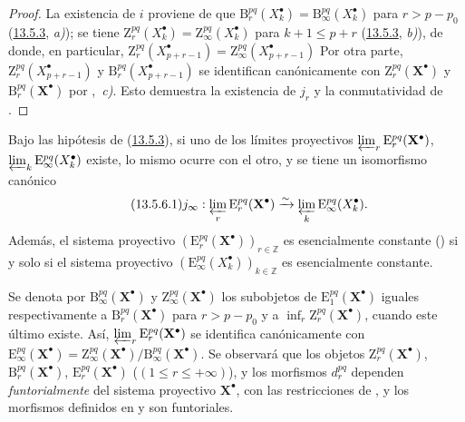 \begin{proof}
La existencia de $i$ proviene de que $\mathrm B_r^{pq}(X_k^\bullet)=\mathrm B_\infty^{pq}(X_k^\bullet)$ para $r>p-p_0$ (\hyperref[0.13.5.3-fr]{13.5.3}, \emph{a)}); se tiene
$\mathrm Z_r^{pq}(X_k^\bullet)=\mathrm Z_\infty^{pq}(X_k^\bullet)$ para $k+1\leq p+r$ (\hyperref[0.13.5.3-fr]{13.5.3}, \emph{b)}), de donde, en particular,
$\mathrm Z_r^{pq}(X_{p+r-1}^\bullet)=
\mathrm Z_\infty^{pq}(X_{p+r-1}^\bullet)$
Por otra parte,
$\mathrm Z_r^{pq}(X_{p+r-1}^\bullet)$ y
$\mathrm B_r^{pq}(X_{p+r-1}^\bullet)$ se identifican canónicamente con
$\mathrm Z_r^{pq}(\mathbf X^\bullet)$ y
$\mathrm B_r^{pq}(\mathbf X^\bullet)$ por
,~\emph{c)}.
Esto demuestra la existencia de $j_r$ y la conmutatividad de
.
\end{proof}

\begin{corollary}[13.5.6]
\label{0.13.5.6-fr}
Bajo las hipótesis de \textup{(\hyperref[0.13.5.3-fr]{13.5.3})}, si uno de los límites proyectivos $\varprojlim_r\mathrm E_r^{pq}(\mathbf X^\bullet)$, $\varprojlim_k\mathrm E_\infty^{pq}(X_k^\bullet)$ existe, lo mismo ocurre con el otro, y se tiene un isomorfismo canónico
\begin{equation}
\label{0.13.5.6.1-fr}
\tag{13.5.6.1}
j_\infty:\varprojlim_r\mathrm E_r^{pq}(\mathbf X^\bullet)
\xrightarrow{\sim}
\varprojlim_k\mathrm E_\infty^{pq}(X_k^\bullet).
\end{equation}
Además, el sistema proyectivo
$(\mathrm E_r^{pq}(\mathbf X^\bullet))_{r\in\mathbb Z}$ es esencialmente
constante \textup{()} si y solo si el sistema proyectivo
$(\mathrm E_\infty^{pq}(X_k^\bullet))_{k\in\mathbb Z}$ es esencialmente
constante.
\end{corollary}

\begin{env}[13.5.7]
\label{0.13.5.7}
\label{0.13.5.7-fr}
Se denota por
$\mathrm B_\infty^{pq}(\mathbf X^\bullet)$ y
$\mathrm Z_\infty^{pq}(\mathbf X^\bullet)$ los subobjetos de
$\mathrm E_1^{pq}(\mathbf X^\bullet)$ iguales respectivamente a
$\mathrm B_r^{pq}(\mathbf X^\bullet)$ para $r>p-p_0$ y a
$\inf_r\mathrm Z_r^{pq}(\mathbf X^\bullet)$, cuando este último existe.
Así,
$\varprojlim_r\mathrm E_r^{pq}(\mathbf X^\bullet)$
se identifica canónicamente con
$\mathrm E_\infty^{pq}(\mathbf X^\bullet)=
\mathrm Z_\infty^{pq}(\mathbf X^\bullet)/
\mathrm B_\infty^{pq}(\mathbf X^\bullet)$.
Se observará que los objetos
$\mathrm Z_r^{pq}(\mathbf X^\bullet)$,
$\mathrm B_r^{pq}(\mathbf X^\bullet)$,
$\mathrm E_r^{pq}(\mathbf X^\bullet)$
($(1\leq r\leq+\infty)$), y los morfismos $d_r^{pq}$ dependen
\emph{funtorialmente} del sistema proyectivo $\mathbf X^\bullet$, con las
restricciones de , y los morfismos definidos en
 y  son funtoriales.
\end{env}

